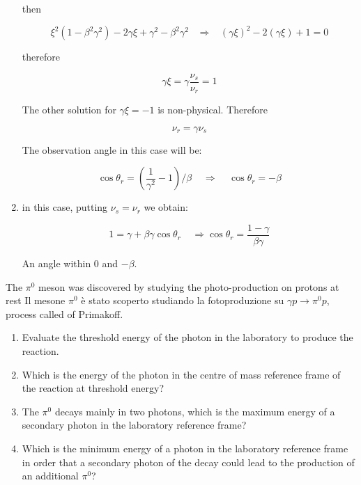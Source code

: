 \begin{solution}
\begin{enumerate}
then

$$ \xi^2 (1- \beta^2 \gamma^2) - 2\gamma \xi + \gamma^2 - \beta^2 \gamma^2 \; \; \; \Rightarrow \; \; \;
(\gamma \xi)^2 - 2 (\gamma \xi) + 1 = 0 $$

therefore

$$\gamma \xi = \gamma \frac{\nu_s}{\nu_r} = 1 $$

The other solution for $\gamma \xi = -1$ is non-physical. Therefore

$$ \nu_r = \gamma \nu_s $$

The observation angle in this case will be:

$$ \cos \theta_r = (\frac{1}{\gamma^2} -1)/\beta \; \; \; \; \Rightarrow \; \; \; \; \cos \theta_r = -\beta $$

\item in this case, putting $\nu_s = \nu_r$ we obtain:

  $$ 1 = \gamma + \beta \gamma \cos \theta_r \; \; \; \; \Rightarrow \cos \theta_r = \frac{1-\gamma}{\beta\gamma} $$

  An angle within 0 and $-\beta$.

\end{enumerate}
\end{solution}


\question

The $\pi^0$ meson was discovered by studying the photo-production on protons at rest
Il mesone $\pi^0$ \`e stato scoperto studiando la fotoproduzione su $\gamma p \rightarrow \pi^0 p$, process called of Primakoff.

\begin{enumerate}

\item Evaluate the threshold energy of the photon in the laboratory to produce the reaction.

\item Which is the energy of the photon in the centre of mass reference frame of the reaction at threshold energy?
  
\item The $\pi^0$ decays mainly in two photons, which is the maximum energy of a secondary photon in the laboratory reference frame?

\item Which is the minimum energy of a photon in the laboratory reference frame in order that a secondary photon of the decay could lead to the production of an additional $\pi^0$?

\end{enumerate}
  
